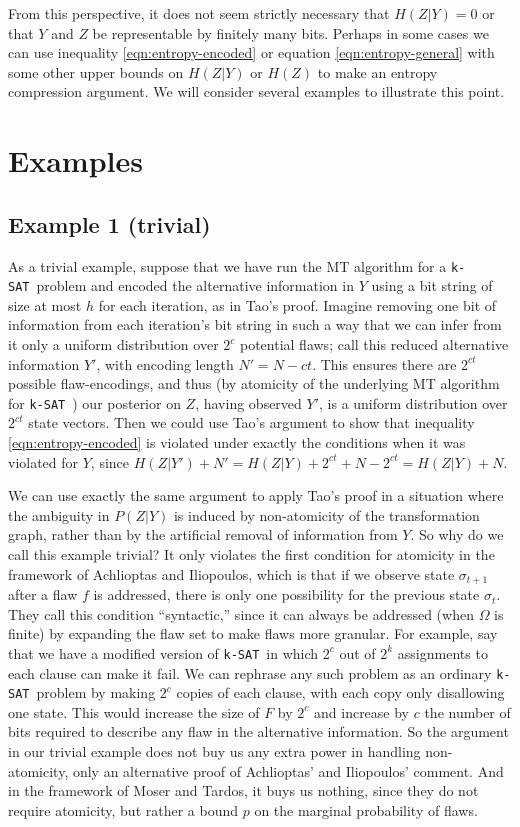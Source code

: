 \documentclass{article}
\newcommand{\ksat}{\texttt{k-SAT}~}
\begin{document}
From this perspective, it does not seem strictly necessary that $H(Z | Y) = 0$ or that $Y$ and $Z$ be representable by finitely many bits.  Perhaps in some cases we can use inequality \ref{eqn:entropy-encoded} or equation \ref{eqn:entropy-general} with some other upper bounds on $H(Z | Y)$ or $H(Z)$ to make an entropy compression argument.  We will consider several examples to illustrate this point.

\section{Examples}
\label{sec:examples}
\subsection{Example 1 (trivial)}
\label{subsec:trivial}
As a trivial example, suppose that we have run the MT algorithm for a \ksat problem and encoded the alternative information in $Y$ using a bit string of size at most $h$ for each iteration, as in Tao's proof.  Imagine removing one bit of information from each iteration's bit string in such a way that we can infer from it only a uniform distribution over $2^c$ potential flaws; call this reduced alternative information $Y'$, with encoding length $N' = N - ct$.  This ensures there are $2^{ct}$ possible flaw-encodings, and thus (by atomicity of the underlying MT algorithm for \ksat) our posterior on $Z$, having observed $Y'$, is a uniform distribution over $2^{ct}$ state vectors.  Then we could use Tao's argument to show that inequality \ref{eqn:entropy-encoded} is violated under exactly the conditions when it was violated for $Y$, since $H(Z | Y') + N' = H(Z | Y) + 2^{ct} + N - 2^{ct} = H(Z | Y) + N$.

We can use exactly the same argument to apply Tao's proof in a situation where the ambiguity in $P(Z | Y)$ is induced by non-atomicity of the transformation graph, rather than by the artificial removal of information from $Y$.  So why do we call this example trivial?  It only violates the first condition for atomicity in the framework of Achlioptas and Iliopoulos, which is that if we observe state $\sigma_{t+1}$ after a flaw $f$ is addressed, there is only one possibility for the previous state $\sigma_t$.  They call this condition ``syntactic,'' since it can always be addressed (when $\Omega$ is finite) by expanding the flaw set to make flaws more granular.  For example, say that we have a modified version of \ksat in which $2^c$ out of $2^k$ assignments to each clause can make it fail.  We can rephrase any such problem as an ordinary \ksat problem by making $2^c$ copies of each clause, with each copy only disallowing one state.  This would increase the size of $F$ by $2^c$ and increase by $c$ the number of bits required to describe any flaw in the alternative information.  So the argument in our trivial example does not buy us any extra power in handling non-atomicity, only an alternative proof of Achlioptas' and Iliopoulos' comment.  And in the framework of Moser and Tardos, it buys us nothing, since they do not require atomicity, but rather a bound $p$ on the marginal probability of flaws.
\end{document}
